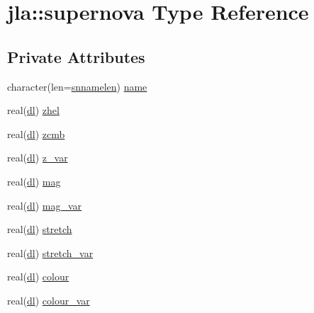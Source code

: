 \hypertarget{structjla_1_1supernova}{}\section{jla\+:\+:supernova Type Reference}
\label{structjla_1_1supernova}
\subsection*{Private Attributes}
\begin{DoxyCompactItemize}
\item 
character(len=\mbox{\hyperlink{namespacejla_a211c3f57dbbc51d6959058d935cc0fb6}{snnamelen}}) \mbox{\hyperlink{structjla_1_1supernova_aa1f8be793c5ef6108ce35a6a25dae445}{name}}
\item 
real(\mbox{\hyperlink{namespacejla_a3aa6435b4e08f1d532390186ac608741}{dl}}) \mbox{\hyperlink{structjla_1_1supernova_ab704b1fe6325eb85ae47c55050575514}{zhel}}
\item 
real(\mbox{\hyperlink{namespacejla_a3aa6435b4e08f1d532390186ac608741}{dl}}) \mbox{\hyperlink{structjla_1_1supernova_a44fc1dba51a4fc0314d20c326d438fd7}{zcmb}}
\item 
real(\mbox{\hyperlink{namespacejla_a3aa6435b4e08f1d532390186ac608741}{dl}}) \mbox{\hyperlink{structjla_1_1supernova_a365c3c52a4a225d0a82a48d6be366d07}{z\+\_\+var}}
\item 
real(\mbox{\hyperlink{namespacejla_a3aa6435b4e08f1d532390186ac608741}{dl}}) \mbox{\hyperlink{structjla_1_1supernova_a679a9f7bbfb607e8a4190d68b33b72e8}{mag}}
\item 
real(\mbox{\hyperlink{namespacejla_a3aa6435b4e08f1d532390186ac608741}{dl}}) \mbox{\hyperlink{structjla_1_1supernova_a2e802cb1c2dcef3b1d36b64cc2860f42}{mag\+\_\+var}}
\item 
real(\mbox{\hyperlink{namespacejla_a3aa6435b4e08f1d532390186ac608741}{dl}}) \mbox{\hyperlink{structjla_1_1supernova_ad1e74c64c1ac22fc6197396962e22a3f}{stretch}}
\item 
real(\mbox{\hyperlink{namespacejla_a3aa6435b4e08f1d532390186ac608741}{dl}}) \mbox{\hyperlink{structjla_1_1supernova_a2c0ba608c53596afb65f292659fb35d8}{stretch\+\_\+var}}
\item 
real(\mbox{\hyperlink{namespacejla_a3aa6435b4e08f1d532390186ac608741}{dl}}) \mbox{\hyperlink{structjla_1_1supernova_a65403d92879e2f75e208f52c742635b9}{colour}}
\item 
real(\mbox{\hyperlink{namespacejla_a3aa6435b4e08f1d532390186ac608741}{dl}}) \mbox{\hyperlink{structjla_1_1supernova_ae2cb31c13b11e89055408af5df3627bd}{colour\+\_\+var}}

\end{DoxyCompactItemize}
